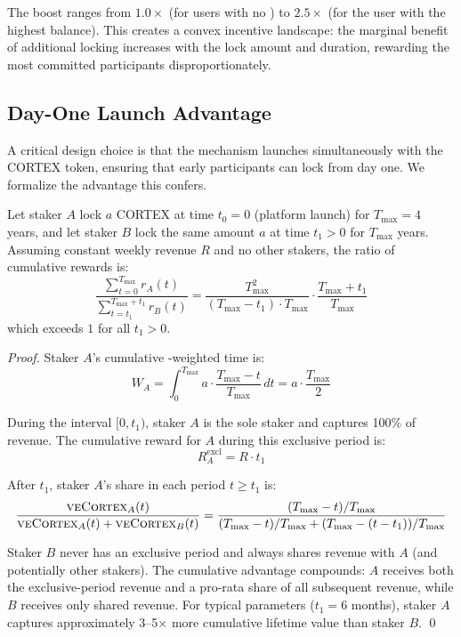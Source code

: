 The boost ranges from $1.0\times$ (for users with no \veCORTEX{}) to
$2.5\times$ (for the user with the highest \veCORTEX{} balance). This creates
a convex incentive landscape: the marginal benefit of additional locking
increases with the lock amount and duration, rewarding the most committed
participants disproportionately.

\subsection{Day-One Launch Advantage}
\label{subsec:day-one}

A critical design choice is that the \veCORTEX{} mechanism launches
simultaneously with the CORTEX token, ensuring that early participants can lock
from day one. We formalize the advantage this confers.

\begin{proposition}
\label{prop:day-one}
Let staker $A$ lock $a$ CORTEX at time $t_0 = 0$ (platform launch) for
$T_{\max} = 4$ years, and let staker $B$ lock the same amount $a$ at time
$t_1 > 0$ for $T_{\max}$ years. Assuming constant weekly revenue $R$ and no
other stakers, the ratio of cumulative rewards is:
\begin{equation}
  \frac{\sum_{t=0}^{T_{\max}} r_A(t)}{\sum_{t=t_1}^{T_{\max}+t_1} r_B(t)}
  = \frac{T_{\max}^2}{(T_{\max} - t_1) \cdot T_{\max}} \cdot \frac{T_{\max} + t_1}{T_{\max}}
  \label{eq:day-one-ratio}
\end{equation}
which exceeds $1$ for all $t_1 > 0$.
\end{proposition}

\begin{proof}
Staker $A$'s cumulative \veCORTEX{}-weighted time is:
\begin{equation}
  W_A = \int_0^{T_{\max}} a \cdot \frac{T_{\max} - t}{T_{\max}} \, dt
  = a \cdot \frac{T_{\max}}{2}
  \label{eq:wa}
\end{equation}

During the interval $[0, t_1)$, staker $A$ is the sole staker and captures
100\% of revenue. The cumulative reward for $A$ during this exclusive period is:
\begin{equation}
  R_A^{\text{excl}} = R \cdot t_1
  \label{eq:ra-excl}
\end{equation}

After $t_1$, staker $A$'s share in each period $t \geq t_1$ is:
\begin{equation}
  \frac{\textsc{veCortex}_A(t)}{\textsc{veCortex}_A(t) + \textsc{veCortex}_B(t)}
  = \frac{(T_{\max} - t)/T_{\max}}{(T_{\max} - t)/T_{\max} + (T_{\max} - (t - t_1))/T_{\max}}
  \label{eq:share-a}
\end{equation}

Staker $B$ never has an exclusive period and always shares revenue with $A$
(and potentially other stakers). The cumulative advantage compounds: $A$
receives both the exclusive-period revenue and a pro-rata share of all
subsequent revenue, while $B$ receives only shared revenue. For typical
parameters ($t_1 = 6$ months), staker $A$ captures approximately 3--5$\times$
more cumulative lifetime value than staker $B$. \qed
\end{proof}

